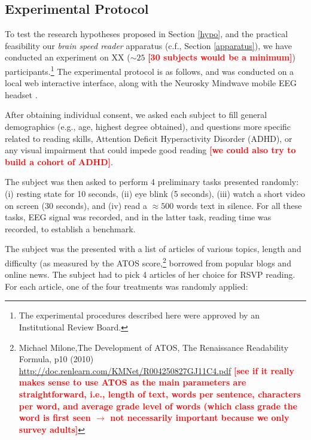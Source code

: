 \subsection{Experimental Protocol}
\label{exp_protocol}

To test the research hypotheses proposed in Section \ref{hypo}, and the practical feasibility our {\it brain speed reader} apparatus (c.f., Section \ref{apparatus}), we  have conducted an experiment on XX ($\sim 25$ \textcolor{red}{\bf [30 subjects would be a minimum]}) participants.\footnote{The experimental procedures described here were approved by an Institutional Review Board.} The experimental protocol is as follows, and was conducted on a local web interactive interface, along with the Neurosky Mindwave mobile EEG headset \cite{}.

After obtaining individual consent, we asked each subject to fill general demographics (e.g., age, highest degree obtained), and questions more specific related to reading skills, Attention Deficit Hyperactivity Disorder (ADHD), or any visual impairment that could impede good reading  \textcolor{red}{\bf [we could also try to build a cohort of ADHD]}.

The subject was then asked to perform 4 preliminary tasks presented randomly: (i) resting state for 10 seconds, (ii) eye blink (5 seconds), (iii) watch a short video on screen (30 seconds), and (iv) read a $\approx 500$ words text in silence. For all these tasks, EEG signal was recorded, and in the latter task, reading time was recorded, to establish a benchmark.

The subject was the presented with a list of articles of various topics, length and difficulty (as measured by the ATOS score,\footnote{Michael Milone,The Development of ATOS, The Renaissance Readability Formula, p10 (2010) \url{http://doc.renlearn.com/KMNet/R004250827GJ11C4.pdf} \textcolor{red}{\bf [see if it really makes sense to use ATOS as the main parameters are straightforward, i.e., length of text, words per sentence, characters per word, and average grade level of words (which class grade the word is first seen $\rightarrow$ not necessarily important because we only survey adults]}} borrowed from popular blogs and online news. The subject had to pick 4 articles of her choice for RSVP reading. For each article, one of the four treatments was randomly applied:


